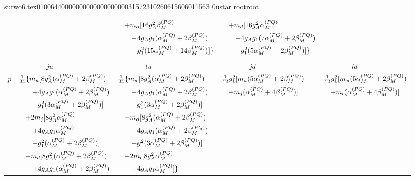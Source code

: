                                                                                                                                                                                                                                                                                       sutwo6.tex                                                                                          0100644 0000000 0000000 00000315723 10260615606 011563  0                                                                                                    ustar   root                            root                                                                                                                                                                                                                   \documentclass[prd,amssymb,amsmath,showpacs,nofootinbib,superscriptaddress]{revtex4}
\begin{document}
\begin{table}[ht]
\begin{tabular}{l | l l l l  }
& 
& $\quad + m_d [16 g_A^2 {\beta}_M^{(PQ)}$
& $\quad + m_d [16 g_A^2 {\alpha}_M^{(PQ)}$
& \\

&
& $\quad\quad -4g_A g_1 ({\alpha}_M^{(PQ)} +2{\beta}_M^{(PQ)})$
& $\quad\quad +4 g_A g_1 (7{\alpha}_M^{(PQ)} +2{\beta}_M^{(PQ)})$
& \\

& 
& $\quad\quad -g_1^2  (15{\alpha}_M^{(PQ)} +14{\beta}_M^{(PQ)})] \} $
& $\quad\quad +g_1^2 (5{\alpha}_M^{(PQ)} -2{\beta}_M^{(PQ)})] \} $
& \\
\hline



\multicolumn{5}{c}{} 
\\
        & $\qquad  \qquad  ju $ & $\qquad \qquad lu $ & $\qquad \qquad jd$ & $\qquad \qquad ld$ \\
\hline
\hline

$p$    

&  $\frac{1}{24} \{ m_u [8 g_A^2 ({\alpha}_M^{(PQ)} +2{\beta}_M^{(PQ)}) $ 
&  $\frac{1}{24} \{ m_u [8 g_A^2 ({\alpha}_M^{(PQ)} +2{\beta}_M^{(PQ)}) $  
&  $\frac{1}{12} g_1^2 [ m_u (5{\alpha}_M^{(PQ)} +2{\beta}_M^{(PQ)}) $ 
&  $\frac{1}{12} g_1^2 [ m_u (5{\alpha}_M^{(PQ)} +2{\beta}_M^{(PQ)}) $ \\


& $\quad\quad +4 g_A g_1 ({\alpha}_M^{(PQ)} +2{\beta}_M^{(PQ)}) $
& $\quad\quad +4 g_A g_1 ({\alpha}_M^{(PQ)} +2{\beta}_M^{(PQ)}) $
& $\quad +m_j ({\alpha}_M^{(PQ)} +4{\beta}_M^{(PQ)})] $
& $\quad +m_l ({\alpha}_M^{(PQ)} +4{\beta}_M^{(PQ)})] $ \\

& $\quad\quad +g_1^2 (3{\alpha}_M^{(PQ)} +2{\beta}_M^{(PQ)})]$
& $\quad\quad +g_1^2 (3{\alpha}_M^{(PQ)} +2{\beta}_M^{(PQ)})]$
&
& \\


& $\quad +2m_j [8 g_A^2 {\alpha}_M^{(PQ)}$
& $\quad +m_d [8 g_A^2 ({\alpha}_M^{(PQ)} +2{\beta}_M^{(PQ)})$
& $ $
& $ $ \\

& $\quad\quad +4g_A g_1 {\alpha}_M^{(PQ)} $
& $\quad\quad +4 g_A g_1 ({\alpha}_M^{(PQ)} +2{\beta}_M^{(PQ)})$
&
&\\

& $\quad\quad +g_1^2 ({\alpha}_M^{(PQ)} +2{\beta}_M^{(PQ)})]$
& $\quad\quad +g_1^2 (3{\alpha}_M^{(PQ)} +2{\beta}_M^{(PQ)})]$
&
& \\

& $\quad +m_d [8 g_A^2 ({\alpha}_M^{(PQ)} +2{\beta}_M^{(PQ)})$
& $\quad +2m_l [8 g_A^2 {\alpha}_M^{(PQ)}$
&
&\\

& $\quad\quad +4 g_A g_1 ({\alpha}_M^{(PQ)} +2{\beta}_M^{(PQ)})$
& $\quad\quad +4g_A g_1 {\alpha}_M^{(PQ)}] \}$
& $ $
& $ $ \\


\end{tabular}
\end{table}
\end{document}
